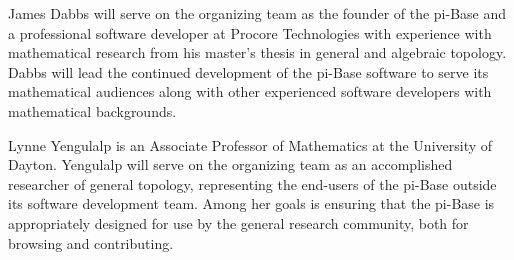 \documentclass{amsart}
\newcommand{\TODO}[1]{\textcolor{red}{(TODO: #1)}}
\begin{document}
James Dabbs will serve on the organizing team as the founder of the pi-Base
and a professional software developer at Procore Technologies 
with experience with mathematical
research from his master's thesis in general and algebraic topology.
Dabbs will lead the continued development of the pi-Base software to
serve its mathematical audiences along with other experienced software
developers with mathematical backgrounds.

Lynne Yengulalp is an Associate Professor of Mathematics at the
University of Dayton. Yengulalp will serve on the organizing team as an accomplished researcher
of general topology, representing the end-users of the pi-Base outside
its software development team.
Among her goals is ensuring that the pi-Base is appropriately designed for
use by the general research community, both for browsing and contributing.

{}


\newpage

%

\end{document}
